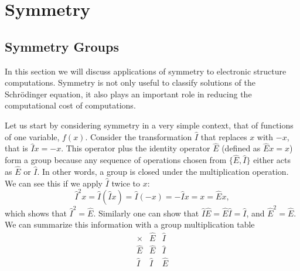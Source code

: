 \documentclass[../Main/chem532-notes.tex]{subfiles}
\begin{document}
\chapter{Symmetry}

\section{Symmetry Groups}

In this section we will discuss applications of symmetry to electronic structure computations.
Symmetry is not only useful to classify solutions of the Schr{\"o}dinger equation, it also plays an important role in reducing the computational cost of computations.

Let us start by considering symmetry in a very simple context, that of functions of one variable, $f(x)$.
Consider the transformation $\hat{I}$ that replaces $x$ with $-x$, that is $\hat{I} x = -x$.
This operator plus the identity operator $\hat{E}$ (defined as $\hat{E} x = x$) form a group because any sequence of operations chosen from $\{\hat{E},\hat{I}\}$ either acts as $\hat{E}$ or $\hat{I}$.
In other words, a group is closed under the multiplication operation.
We can see this if we apply $\hat{I}$ twice to $x$:
\begin{equation}
\hat{I}^2x = \hat{I}(\hat{I}x) = \hat{I} (-x) = -\hat{I}x = x = \hat{E} x,
\end{equation}
which shows that $\hat{I}^2 = \hat{E}$. Similarly one can show that $\hat{I} \hat{E}=\hat{E} \hat{I} = \hat{I}$, and $\hat{E}^2 = \hat{E}$.
We can summarize this information with a group multiplication table
\begin{equation}
   \begin{array}{c|cc} %
        \times  & \hat{E} & \hat{I} \\
   \hline
     \hat{E} & \hat{E} & \hat{I} \\
      \hat{I} & \hat{I} & \hat{E}
   \end{array}
\end{equation}
\end{document}
